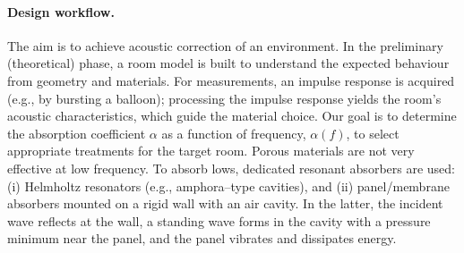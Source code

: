 \paragraph{Design workflow.}
The aim is to achieve acoustic correction of an environment. In the preliminary (theoretical) phase, a room model is built to understand the expected behaviour from geometry and materials. For measurements, an impulse response is acquired (e.g., by bursting a balloon); processing the impulse response yields the room’s acoustic characteristics, which guide the material choice.
Our goal is to determine the absorption coefficient \(\alpha\) as a function of frequency, \(\alpha(f)\), to select appropriate treatments for the target room. Porous materials are not very effective at low frequency. To absorb lows, dedicated resonant absorbers are used: (i) Helmholtz resonators (e.g., amphora–type cavities), and (ii) panel/membrane absorbers mounted on a rigid wall with an air cavity. In the latter, the incident wave reflects at the wall, a standing wave forms in the cavity with a pressure minimum near the panel, and the panel vibrates and dissipates energy.
